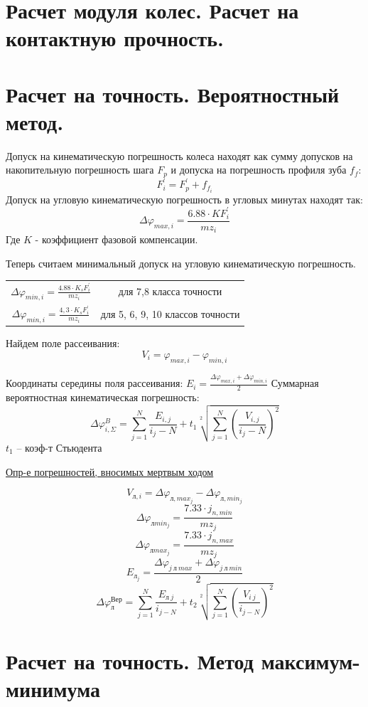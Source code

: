 \documentclass{article}
\begin{document}
\section {Расчет модуля колес. Расчет на контактную прочность.}

\section {Расчет на точность. Вероятностный метод.}

Допуск на кинематическую погрешность колеса находят как сумму допусков на накопительную
погрешность шага $F_p$ и допуска на погрешность профиля зуба $f_f$:
$$
F_i^{'} = F_p^{'} + f_{f_i}
$$
Допуск на угловую кинематическую погрешность в угловых минутах находят так:
$$
\Delta \varphi_{max, i} = \frac{6.88 \cdot K F_i^{'}}{m z_i} 
$$
Где $K$ - коэффициент фазовой компенсации.

Теперь считаем минимальный допуск на угловую кинематическую погрешность.

\begin{tabular}{cc}
$ \Delta \varphi_{min,i} = \frac{4.88 \cdot K_s F_i^{'}}{m z_i} $ & для 7,8 класса точности \\
$ \Delta \varphi_{min,i} = \frac{4,3 \cdot K_s F_i^{'}}{m z_i} $  & для 5, 6, 9, 10 классов точности
\end{tabular}

Найдем поле рассеивания:
$$
V_i = \varphi_{max, i} - \varphi_{min, i}
$$

Координаты середины поля рассеивания: $E_i = \frac{ \Delta \varphi_{max, i} + \Delta \varphi_{min, i}}{2} $
Суммарная вероятностная кинематическая погрешность:
$$
\Delta \varphi_{i, \Sigma}^{B} = \sum\limits_{j = 1}^{N} \frac{E_{i,j}}{i_j - N} + t_1 \sqrt[2]{\sum\limits_{j = 1}^{N} \left(\frac{V_{i,j}}{i_j - N}\right)^2}
$$
$t_1$ -- коэф-т Стьюдента

\underline{Опр-е погрешностей, вносимых мертвым ходом} 

$$
V_{л, i} = \Delta \varphi_{л, max_j} - \Delta \varphi_{л, min_j}
$$
$$
\Delta \varphi_{л min_j} = \frac{7.33 \cdot j_{n, min}}{m z_j} 
$$
$$
\Delta \varphi_{л max_j} = \frac{7.33 \cdot j_{n, max}}{m z_j} 
$$
$$
E_{л_j} = \frac{ \Delta \varphi_{j \: л \: max} + \Delta \varphi_{j \: л \: min}}{2}
$$
$$
\Delta \varphi_{л}^{Вер} = \sum\limits_{j = 1}^{N} \frac{E_{л \: j}}{i_{j - N}} + t_2 \sqrt[2]{\sum\limits_{j = 1}^{N} \left(\frac{V_{i \: j}}{i_{j - N}} \right)^2}
$$

\section {Расчет на точность. Метод максимум-минимума}
\end{document}
